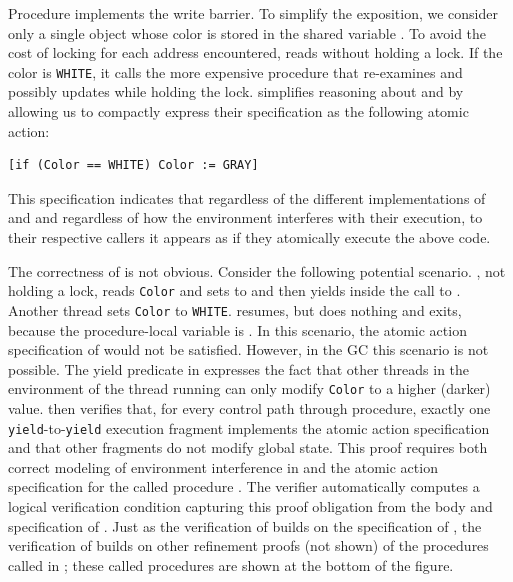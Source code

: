 Procedure  implements the write barrier.
To simplify the exposition, 
we consider only a single object whose color is stored in the shared variable .
To avoid the cost of locking for each address encountered,  reads  without holding a lock.
If the color is {\tt WHITE}, it calls the more expensive procedure  
that re-examines and possibly updates  while holding the lock.
\civl simplifies reasoning about  and  by allowing us to 
compactly express their specification as the following atomic action:
\begin{verbatim}
[if (Color == WHITE) Color := GRAY]
\end{verbatim}
This specification indicates that regardless of the different implementations of 
 and  and regardless of how the environment interferes
with their execution, to their respective callers it appears as if they atomically execute the above code.

The correctness of  is not obvious.
Consider the following potential scenario. 
, not holding a lock, reads {\tt Color} and
sets  to  and then yields inside the call to
. Another thread sets {\tt Color} to
{\tt WHITE}.  resumes, but does nothing and exits,
because the procedure-local variable  is . In this scenario, the atomic action
specification of  would not be satisfied. However, in the GC this
scenario is not possible. 
The yield predicate in  expresses the fact that
other threads in the environment of the thread running  can
only modify {\tt Color} to a higher (darker) value. 
\civl then verifies that, for every control path through 
procedure, exactly one {\tt yield}-to-{\tt yield} execution
fragment implements the atomic action specification and that other fragments do not modify
global state. 
This proof requires both correct modeling of environment interference in 
and the atomic action specification for the called procedure .
The \civl verifier automatically computes a logical verification condition capturing
this proof obligation from the body and specification of .
Just as the verification of  builds on the specification of ,
the verification of  builds on other refinement proofs (not shown) 
of the procedures called in ;
these called procedures are shown at the bottom of the figure. 

